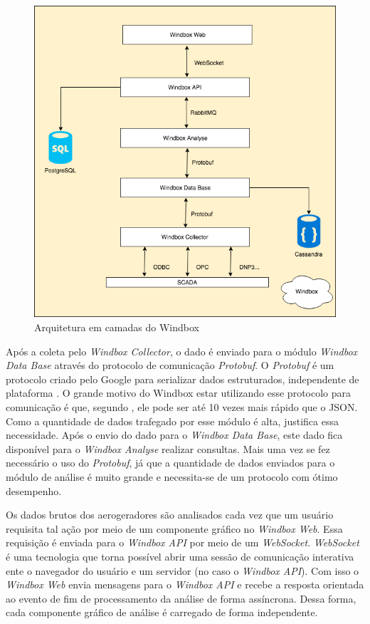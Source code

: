 \begin{figure}[htbp!] \begin{center}
\includegraphics[width=0.75\linewidth]{./figuras/arquitetura-windbox}
\caption{Arquitetura em camadas do Windbox}
\label{Fig:arquiteturaWindbox}
\end{center} 
\end{figure}

Após a coleta pelo \textit{Windbox Collector}, o dado é enviado para o módulo \textit{Windbox Data Base} através do protocolo de comunicação \textit{Protobuf}. O \textit{Protobuf} é um protocolo criado pelo Google para serializar dados estruturados, independente de plataforma \cite{protobuf-google}. O grande motivo do Windbox estar utilizando esse protocolo para comunicação é que, segundo , ele pode ser até 10 vezes mais rápido que o JSON. Como a quantidade de dados trafegado por esse módulo é alta, justifica essa necessidade. Após o envio do dado para o \textit{Windbox Data Base}, este dado fica disponível para o \textit{Windbox Analyse} realizar consultas. Mais uma vez se fez necessário o uso do \textit{Protobuf}, já que a quantidade de dados enviados para o módulo de análise é muito grande e necessita-se de um protocolo com ótimo desempenho.

Os dados brutos dos aerogeradores são analisados cada vez que um usuário requisita tal ação por meio de um componente gráfico no \textit{Windbox Web}. Essa requisição é enviada para o \textit{Windbox API} por meio de um \textit{WebSocket}. \textit{WebSocket} é uma tecnologia que torna possível abrir uma sessão de comunicação interativa ente o navegador do usuário e um servidor (no caso o \textit{Windbox API}). Com isso o \textit{Windbox Web} envia mensagens para o \textit{Windbox API} e recebe a resposta orientada ao evento de fim de processamento da análise de forma assíncrona. Dessa forma, cada componente gráfico de análise é carregado de forma independente. 

